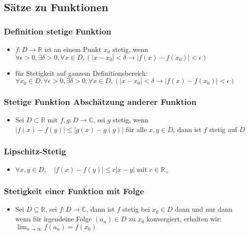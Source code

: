 \documentclass[a3paper, 11pt, landscape]{scrartcl}
\begin{document}
\begin{multicols*}{3}
	\subsection{Sätze zu Funktionen}
	\subsubsection{Definition stetige Funktion}
	\begin{itemize}
	    \item $f: D \to \mathbb{R}$ ist an einem Punkt $x_0$ stetig, wenn \\
	    $\forall \epsilon > 0, \exists \delta > 0, \forall x \in D, (| x-x_0|<\delta \to | f(x) - f(x_0) | < \epsilon)$
	    \item für Stetigkeit auf ganzem Definitionsbereich: \\ 
	    $\forall x_0 \in D, \forall \epsilon > 0, \exists \delta > 0, \forall x \in D, (| x-x_0|<\delta \to | f(x) - f(x_0) | < \epsilon)$
	\end{itemize}
	
	\subsubsection{Stetige Funktion Abschätzung anderer Funktion}
	\begin{itemize}
	    \item Sei $D\subset\mathbb{R}$ mit $f, g: D \to\mathbb{C}$, sei $g$ stetig, wenn\\
	    $|f(x)-f(y)|\leq | g(x)-g(y)|$ für alle $x,y\in D$, dann ist $f$ stetig auf $D$
	\end{itemize}
	
	\subsubsection{Lipschitz-Stetig}
	\begin{itemize}
	    \item $\forall x,y \in D, \quad |f(x) -f(y)| \leq c|x-y|$ mit $c\in \mathbb{R_+}$
	\end{itemize}
	
	\subsubsection{Stetigkeit einer Funktion mit Folge}
	\begin{itemize}
	    \item Sei $D \subseteq \mathbb{R}$, sei $f:D\to \mathbb{C}$, dann ist $f$ stetig bei $x_0\in D$ dann und nur dann wenn für irgendeine Folge $(a_n) \in D$ zu $x_0$ konvergiert, erhalten wir: $\lim_{n\to\infty}f(a_n)=f(x_0)$
	\end{itemize}

\end{multicols*}
\end{document}
